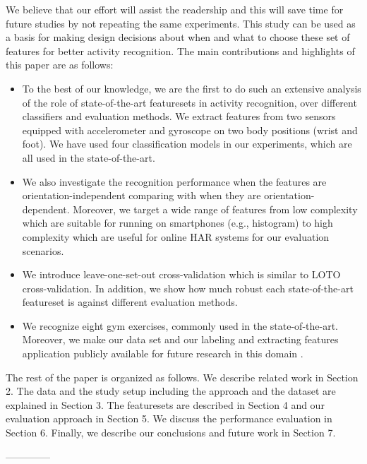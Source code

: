\documentclass[journal,article,submit,moreauthors,pdftex]{Definitions/mdpi}
\begin{document}
We believe that our effort will assist the readership and this will save time for future studies by not repeating the same experiments. This study can be used as a basis for making design decisions about when and what to choose these set of features for better activity recognition. The main contributions and highlights of this paper are as follows:


\begin{itemize}
	\item To the best of our knowledge, we are the first to do such an extensive analysis of the role of state-of-the-art featuresets in activity recognition, over different classifiers and evaluation methods. We extract features from two sensors equipped with accelerometer and gyroscope on two body positions (wrist and foot). We have used four classification models in our experiments, which are all used in the state-of-the-art. 
	\item We also investigate the recognition performance when the features are orientation-independent comparing with when they are orientation-dependent. Moreover, we target a wide range of features from low complexity which are suitable for running on smartphones (e.g., histogram) to high complexity which are useful for online HAR systems\cite{morris2014recofit} for our evaluation scenarios.
	\item We introduce leave-one-set-out cross-validation which is similar to LOTO cross-validation. In addition, we show how much robust each state-of-the-art featureset is against different evaluation methods.
	\item We recognize eight gym exercises, commonly used in the state-of-the-art. Moreover, we make our data set and our labeling and extracting features application publicly available for future research in this domain \cite{gymDataset}.
\end{itemize}


The rest of the paper is organized as follows. We describe related work in Section 2. The data and the study setup including the approach and the dataset are explained in Section 3. The featuresets are described in Section 4 and our evaluation approach in Section 5. We discuss the performance evaluation in Section 6. Finally, we describe our conclusions and future work in Section 7.

--------------
\end{document}
